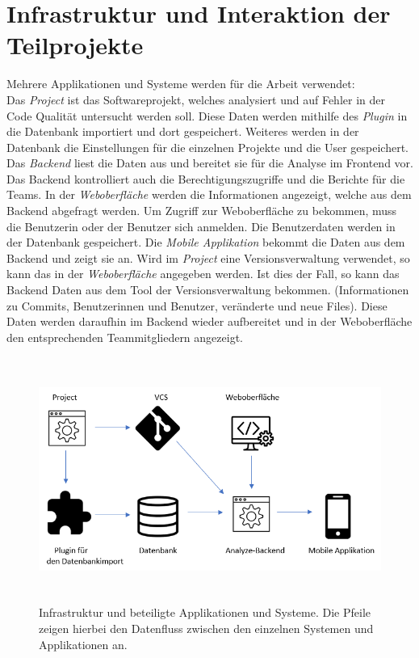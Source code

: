 \section{Infrastruktur und Interaktion der Teilprojekte}
Mehrere Applikationen und Systeme werden für die Arbeit verwendet: \\
Das \textit{Project} ist das Softwareprojekt, welches analysiert und auf Fehler in der Code Qualität untersucht werden soll. Diese Daten werden mithilfe des \textit{Plugin} in die Datenbank importiert und dort gespeichert. Weiteres werden in der Datenbank die Einstellungen für die einzelnen Projekte und die User gespeichert. Das \textit{Backend} liest die Daten aus und bereitet sie für die Analyse im Frontend vor. Das Backend kontrolliert auch die Berechtigungszugriffe und die Berichte für die Teams. In der \textit{Weboberfläche} werden die Informationen angezeigt, welche aus dem Backend abgefragt werden. Um Zugriff zur Weboberfläche zu bekommen, muss die Benutzerin oder der Benutzer sich anmelden. Die Benutzerdaten werden in der Datenbank gespeichert.
Die \textit{Mobile Applikation} bekommt die Daten aus dem Backend und zeigt sie an. Wird im \textit{Project} eine Versionsverwaltung verwendet, so kann das in der \textit{Weboberfläche} angegeben werden. Ist dies der Fall, so kann das Backend Daten aus dem Tool der Versionsverwaltung bekommen. (Informationen zu Commits, Benutzerinnen und Benutzer, veränderte und neue Files). Diese Daten werden daraufhin im Backend wieder aufbereitet und in der Weboberfläche den entsprechenden Teammitgliedern angezeigt.
\begin{figure}[tp]
  \centering
  \includegraphics[height=8cm]{images/infrastruktur.PNG}
 \caption[Infrastruktur und beteiligte Applikationen und Systeme]{Infrastruktur und beteiligte Applikationen und Systeme. Die Pfeile zeigen hierbei den Datenfluss zwischen den einzelnen Systemen und Applikationen an.}
  \label{fig:findingsInIDE}
\end{figure}
\chapterend